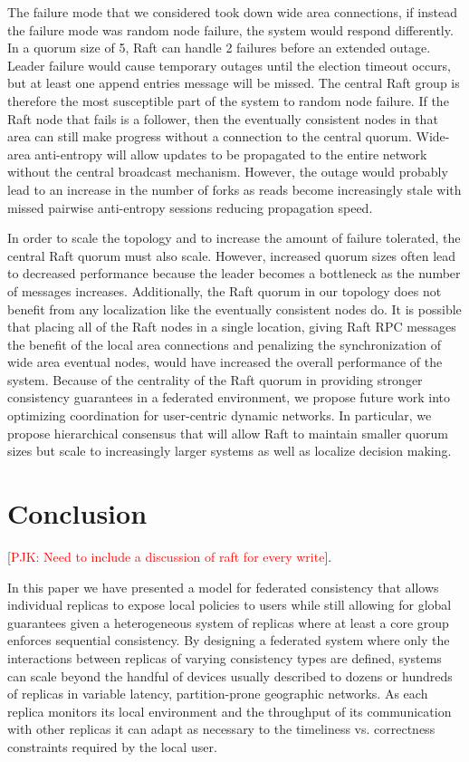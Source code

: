 \documentclass[10pt,conference,letterpaper]{IEEEtran}
\newcommand{\todo}[1]{{\textcolor{red}{#1}}}
\newcommand{\pjk}[1]{[\todo{PJK: #1}]}
\begin{document}
The failure mode that we considered took down wide area connections, if instead the failure mode was random node failure, the system would respond differently. In a quorum size of 5, Raft can handle 2 failures before an extended outage. Leader failure would cause temporary outages until the election timeout occurs, but at least one append entries message will be missed. The central Raft group is therefore the most susceptible part of the system to random node failure. If the Raft node that fails is a follower, then the eventually consistent nodes in that area can still make progress without a connection to the central quorum. Wide-area anti-entropy will allow updates to be propagated to the entire network without the central broadcast mechanism. However, the outage would probably lead to an increase in the number of forks as reads become increasingly stale with missed pairwise anti-entropy sessions reducing propagation speed.

In order to scale the topology and to increase the amount of failure tolerated, the central Raft quorum must also scale. However, increased quorum sizes often lead to decreased performance because the leader becomes a bottleneck as the number of messages increases. Additionally, the Raft quorum in our topology does not benefit from any localization like the eventually consistent nodes do. It is possible that placing all of the Raft nodes in a single location, giving Raft RPC messages the benefit of the local area connections and penalizing the synchronization of wide area eventual nodes, would have increased the overall performance of the system. Because of the centrality of the Raft quorum in providing stronger consistency guarantees in a federated environment, we propose future work into optimizing coordination for user-centric dynamic networks. In particular, we propose hierarchical consensus that will allow Raft to maintain smaller quorum sizes but scale to increasingly larger systems as well as localize decision making.

\section{Conclusion}

\pjk{Need to include a discussion of raft for every write}.

In this paper we have presented a model for federated consistency that allows individual replicas to expose local policies to users while still allowing for global guarantees given a heterogeneous system of replicas where at least a core group enforces sequential consistency. By designing a federated system where only the interactions between replicas of varying consistency types are defined, systems can scale beyond the handful of devices usually described to dozens or hundreds of replicas in variable latency, partition-prone geographic networks. As each replica monitors its local environment and the throughput of its communication with other replicas it can adapt as necessary to the timeliness vs. correctness constraints required by the local user.

%



\end{document}
